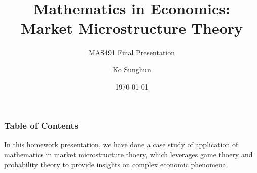 \documentclass{beamer}
\title{Mathematics in Economics: \\ Market Microstructure Theory}
\subtitle{MAS491 Final Presentation}
\author{Ko Sunghun}
\institute{KAIST}
\date{\today}
\begin{document}
\begin{frame}
    \titlepage
\end{frame}
\begin{frame}
    \frametitle{Table of Contents}
    In this homework presentation, we have done a case study of application of mathematics in market microstructure thoery, which leverages game thoery and probability theory to provide insights on complex economic phenomena.
    \tableofcontents
\end{frame}

\end{document}
